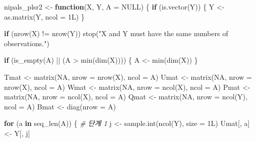 \documentclass[
]{book}
\newenvironment{Shaded}{\begin{snugshade}}{\end{snugshade}}
\newcommand{\AttributeTok}[1]{\textcolor[rgb]{0.77,0.63,0.00}{#1}}
\newcommand{\CommentTok}[1]{\textcolor[rgb]{0.56,0.35,0.01}{\textit{#1}}}
\newcommand{\ConstantTok}[1]{\textcolor[rgb]{0.00,0.00,0.00}{#1}}
\newcommand{\ControlFlowTok}[1]{\textcolor[rgb]{0.13,0.29,0.53}{\textbf{#1}}}
\newcommand{\FunctionTok}[1]{\textcolor[rgb]{0.00,0.00,0.00}{#1}}
\newcommand{\NormalTok}[1]{#1}
\newcommand{\OtherTok}[1]{\textcolor[rgb]{0.56,0.35,0.01}{#1}}
\newcommand{\SpecialCharTok}[1]{\textcolor[rgb]{0.00,0.00,0.00}{#1}}
\newcommand{\StringTok}[1]{\textcolor[rgb]{0.31,0.60,0.02}{#1}}
\begin{document}
\begin{Shaded}
\begin{Highlighting}[]
\NormalTok{nipals\_plsr2 }\OtherTok{\textless{}{-}} \ControlFlowTok{function}\NormalTok{(X, Y, }\AttributeTok{A =} \ConstantTok{NULL}\NormalTok{) \{}
  \ControlFlowTok{if}\NormalTok{ (}\FunctionTok{is.vector}\NormalTok{(Y)) \{}
\NormalTok{    Y }\OtherTok{\textless{}{-}} \FunctionTok{as.matrix}\NormalTok{(Y, }\AttributeTok{ncol =}\NormalTok{ 1L)}
\NormalTok{  \}}
  
  \ControlFlowTok{if}\NormalTok{ (}\FunctionTok{nrow}\NormalTok{(X) }\SpecialCharTok{!=} \FunctionTok{nrow}\NormalTok{(Y)) }\FunctionTok{stop}\NormalTok{(}\StringTok{"X and Y must have the same numbers of observations."}\NormalTok{)}
  
  \ControlFlowTok{if}\NormalTok{ (}\FunctionTok{is\_empty}\NormalTok{(A) }\SpecialCharTok{||}\NormalTok{ (A }\SpecialCharTok{\textgreater{}} \FunctionTok{min}\NormalTok{(}\FunctionTok{dim}\NormalTok{(X)))) \{}
\NormalTok{    A }\OtherTok{\textless{}{-}} \FunctionTok{min}\NormalTok{(}\FunctionTok{dim}\NormalTok{(X))}
\NormalTok{  \}}
  
\NormalTok{  Tmat }\OtherTok{\textless{}{-}} \FunctionTok{matrix}\NormalTok{(}\ConstantTok{NA}\NormalTok{, }\AttributeTok{nrow =} \FunctionTok{nrow}\NormalTok{(X), }\AttributeTok{ncol =}\NormalTok{ A)}
\NormalTok{  Umat }\OtherTok{\textless{}{-}} \FunctionTok{matrix}\NormalTok{(}\ConstantTok{NA}\NormalTok{, }\AttributeTok{nrow =} \FunctionTok{nrow}\NormalTok{(X), }\AttributeTok{ncol =}\NormalTok{ A)}
\NormalTok{  Wmat }\OtherTok{\textless{}{-}} \FunctionTok{matrix}\NormalTok{(}\ConstantTok{NA}\NormalTok{, }\AttributeTok{nrow =} \FunctionTok{ncol}\NormalTok{(X), }\AttributeTok{ncol =}\NormalTok{ A)}
\NormalTok{  Pmat }\OtherTok{\textless{}{-}} \FunctionTok{matrix}\NormalTok{(}\ConstantTok{NA}\NormalTok{, }\AttributeTok{nrow =} \FunctionTok{ncol}\NormalTok{(X), }\AttributeTok{ncol =}\NormalTok{ A)}
\NormalTok{  Qmat }\OtherTok{\textless{}{-}} \FunctionTok{matrix}\NormalTok{(}\ConstantTok{NA}\NormalTok{, }\AttributeTok{nrow =} \FunctionTok{ncol}\NormalTok{(Y), }\AttributeTok{ncol =}\NormalTok{ A)}
\NormalTok{  Bmat }\OtherTok{\textless{}{-}} \FunctionTok{diag}\NormalTok{(}\AttributeTok{nrow =}\NormalTok{ A)}
  
  \ControlFlowTok{for}\NormalTok{ (a }\ControlFlowTok{in} \FunctionTok{seq\_len}\NormalTok{(A)) \{}
    \CommentTok{\# 단계 1}
\NormalTok{    j }\OtherTok{\textless{}{-}} \FunctionTok{sample.int}\NormalTok{(}\FunctionTok{ncol}\NormalTok{(Y), }\AttributeTok{size =}\NormalTok{ 1L)}
\NormalTok{    Umat[, a] }\OtherTok{\textless{}{-}}\NormalTok{ Y[, j]}
    

\end{Highlighting}
\end{Shaded}
\end{document}

